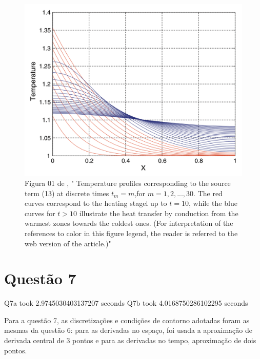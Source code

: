 \documentclass{article}
\begin{document}
\begin{figure}[h]
\centering
     \includegraphics[width=\textwidth]{figs/chinesta_fig1.png}
     \caption{Figura 01 de \cite{chinesta}, "
Temperature profiles corresponding to the source term (13) at discrete times
$t_m =m$,for $m=1,2,...,30$. The red curves correspond to the heating stagel up to $t=10$, while the blue curves for $t > 10$ illustrate the heat transfer by conduction from the
warmest zones towards the coldest ones. (For interpretation of the references to
    color in this figure legend, the reader is referred to the web version of the article.)"}
    \label{fig:chinesta}
\end{figure}


\section{Questão 7}

Q7a took 2.9745030403137207 seconds
Q7b took 4.0168750286102295 seconds

Para a questão 7, as discretizações e condições de contorno adotadas foram as mesmas da questão 6:
para as derivadas no espaço, foi usada a aproximação de derivada central de 3 pontos e para as derivadas no tempo, aproximação de dois pontos.
\end{document}
